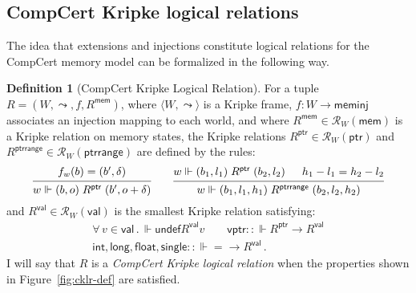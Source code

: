 \documentclass[11pt,oneside]{book}
\theoremstyle{definition}
\newtheorem{definition}[theorem]{Definition}
\newcommand{\kw}[1]{\ensuremath{ \mathsf{#1} }}
\begin{document}

\subsection{CompCert Kripke logical relations} \label{sec:cklrdef} %

The idea that
extensions and injections
constitute logical relations for the CompCert memory model
can be formalized in the following way.

\begin{definition}[CompCert Kripke Logical Relation] \label{def:cklr} %
For a tuple $R = (W, \leadsto, f, R^\kw{mem})$,
where
$\langle W, \leadsto \rangle$ is a Kripke frame,
$f : W \rightarrow \kw{meminj}$
associates an injection mapping to each world, and where
$R^\kw{mem} \in \mathcal{R}_{W}(\kw{mem})$
is a Kripke relation on memory states,
the Kripke relations
$R^\kw{ptr} \in \mathcal{R}_W(\kw{ptr})$ and
$R^\kw{ptrrange} \in \mathcal{R}_W(\kw{ptrrange})$
are defined by the rules:
\[
  \begin{prooftree}
    \hypo{f_w(b) = (b', \delta)}
    \infer1{w \Vdash (b, o) \mathrel{R^\kw{ptr}} (b', o + \delta)}
  \end{prooftree}
  \qquad
  \begin{prooftree}
    \hypo{w \Vdash (b_1, l_1) \mathrel{R^\kw{ptr}} (b_2, l_2)}
    \hypo{h_1 - l_1 = h_2 - l_2}
    \infer2{w \Vdash (b_1, l_1, h_1) \mathrel{R^\kw{ptrrange}} (b_2, l_2, h_2)}
  \end{prooftree}
\]
and
$R^\kw{val} \in \mathcal{R}_W(\kw{val})$
is the smallest Kripke relation satisfying:
\begin{gather*}
  \forall \, v \in \kw{val} \,.\,
    \Vdash \kw{undef} \mathrel{R^\kw{val}} v \qquad
  \kw{vptr} :: {\Vdash R^\kw{ptr} \rightarrow R^\kw{val}} \\
  \kw{int}, \kw{long}, \kw{float}, \kw{single} ::
    {\Vdash {=} \rightarrow R^\kw{val}} \,.
\end{gather*}
I will say that $R$ is a \emph{CompCert Kripke logical relation}
when the properties shown in Figure~\ref{fig:cklr-def} are satisfied.
\end{definition}
\end{document}
